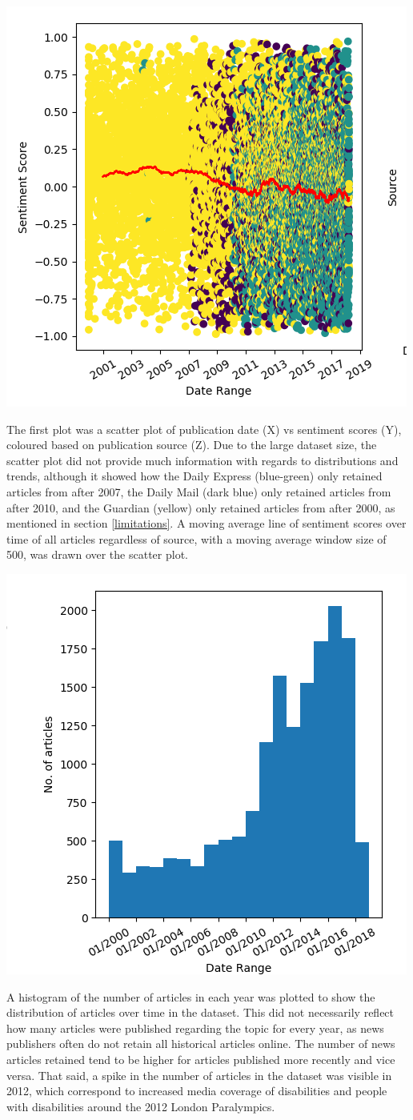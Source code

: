\documentclass{report}
\newcommand{\textapprox}{\raisebox{0.5ex}{\texttildelow}}  %
\begin{document}
\begin{center}
	\includegraphics[height=0.5\linewidth]{row-1-col-1.png}
\end{center}

The first plot was a scatter plot of publication date (X) vs sentiment scores (Y), coloured based on publication source (Z). 
Due to the large dataset size, the scatter plot did not provide much information with regards to distributions and trends, although it showed how the Daily Express (blue-green) only retained articles from after \textapprox2007, the Daily Mail (dark blue) only retained articles from after \textapprox2010, and the Guardian (yellow) only retained articles from after \textapprox2000, as mentioned in section \ref{limitations}.
A moving average line of sentiment scores over time of all articles regardless of source, with a moving average window size of 500, was drawn over the scatter plot.

\begin{center}
	\includegraphics[width=0.5\linewidth]{row-1-col-3.png}
\end{center}

A histogram of the number of articles in each year was plotted to show the distribution of articles over time in the dataset. 
This did not necessarily reflect how many articles were published regarding the topic for every year, as news publishers often do not retain all historical articles online. 
The number of news articles retained tend to be higher for articles published more recently and vice versa.
That said, a spike in the number of articles in the dataset was visible in 2012, which correspond to increased media coverage of disabilities and people with disabilities around the 2012 London Paralympics.
\end{document}
